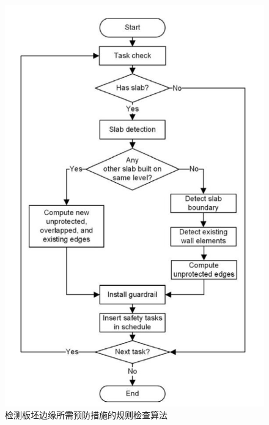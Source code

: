 \begin{figure}[thbp!]
    \centering
    \includegraphics[width=1.0\linewidth]{res/c3f1.png}
    \caption{检测板坯边缘所需预防措施的规则检查算法}
    \label{fig:c3f1}
\end{figure}




